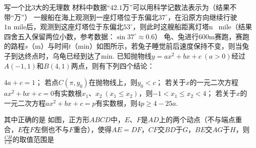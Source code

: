 \documentclass[10pt]{article}
\begin{document}
\begin{questions}{\complitingintroduction}
    \question 写一个比$3$大的无理数\complitingline
    材料中数据``$42.1$万''可以用科学记数法表示为\complitingline （结果不带``万''）
    \question 一艘船在海上观测到一座灯塔位于东偏北$37^{\circ}$，在沿原方向继续行驶$1\text{n \ mile}$后，观测到这座灯塔位于东偏北$53^{\circ}$，则此时这艘船距离灯塔\complitingline n \ mile（结果四舍五入保留两位小数，参考数据：$\sin 37^{\circ} \approx 0.6$）
    \question 龟、兔进行$600$m赛跑，赛跑的路程$s$（m）与时间$t$（min）如图所示，若兔子睡觉前后速度保持不变，则当兔子到达终点时，乌龟已经到达了\complitingline min.
    \question 已知抛物线$y=ax^2+bx+c \ (a > 0)$经过$A(-1,1)$和$B(4,1)$两点，则有下列四个结论：
    \begin{subsubquestions}
        \subsubquestion $4a+c=1$；
        \subsubquestion 若点$C(\pi,y_0)$在抛物线上，则$y_0 < c$；
        \subsubquestion 若关于$x$的一元二次方程$ax^2+bx+c=0$有实数根$x_1$、$x_2 \ (x_1 \leq x_2)$，则$-1 < x_1 \leq x_2 < 4$；
        \subsubquestion 若关于$x$的一元二次方程$ax^2+bx+c=p$有实数根，则$4p \geq 4-25a$.
    \end{subsubquestions}
    其中正确的是\complitingline
    \question 如图，正方形$ABCD$中，$E$、$F$是$AD$上的两个动点（不与端点重合，$E$在$F$左侧也不与$F$重合），使得$AE=DF$，$CF$交$BD$于$G$，$BE$交$AG$于$H$，则$\frac{CH}{CE}$的取值范围是\complitingline


\end{questions}
\end{document}
